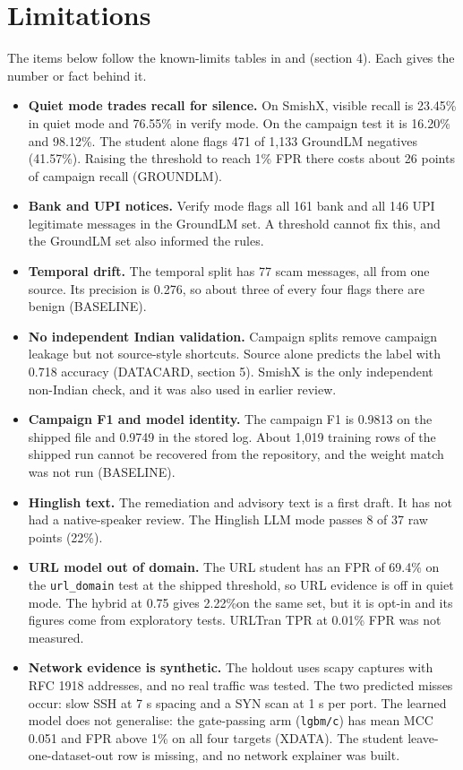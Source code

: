 \section{Limitations}\label{sec:limitations}

The items below follow the known-limits tables in  and  (section 4). Each gives the number or fact behind it.

\begin{itemize}
\item \textbf{Quiet mode trades recall for silence.} On SmishX, visible recall is 23.45\% in quiet mode and 76.55\% in verify mode. On the campaign test it is 16.20\% and 98.12\%. The student alone flags 471 of 1,133 GroundLM negatives (41.57\%). Raising the threshold to reach 1\% FPR there costs about 26 points of campaign recall (GROUNDLM).
\item \textbf{Bank and UPI notices.} Verify mode flags all 161 bank and all 146 UPI legitimate messages in the GroundLM set. A threshold cannot fix this, and the GroundLM set also informed the rules.
\item \textbf{Temporal drift.} The temporal split has 77 scam messages, all from one source. Its precision is 0.276, so about three of every four flags there are benign (BASELINE).
\item \textbf{No independent Indian validation.} Campaign splits remove campaign leakage but not source-style shortcuts. Source alone predicts the label with 0.718 accuracy (DATACARD, section 5). SmishX is the only independent non-Indian check, and it was also used in earlier review.
\item \textbf{Campaign F1 and model identity.} The campaign F1 is 0.9813 on the shipped file and 0.9749 in the stored log. About 1,019 training rows of the shipped run cannot be recovered from the repository, and the weight match was not run (BASELINE).
\item \textbf{Hinglish text.} The remediation and advisory text is a first draft. It has not had a native-speaker review. The Hinglish LLM mode passes 8 of 37 raw points (22\%)\prose.
\item \textbf{URL model out of domain.} The URL student has an FPR of 69.4\% on the \texttt{url\_domain} test at the shipped threshold, so URL evidence is off in quiet mode. The hybrid at 0.75 gives 2.22\%\prose on the same set, but it is opt-in and its figures come from exploratory tests. URLTran TPR at 0.01\% FPR was not measured.
\item \textbf{Network evidence is synthetic.} The holdout uses scapy captures with RFC 1918 addresses, and no real traffic was tested. The two predicted misses occur: slow SSH at 7 s spacing and a SYN scan at 1 s per port. The learned model does not generalise: the gate-passing arm (\texttt{lgbm/c}) has mean MCC 0.051 and FPR above 1\% on all four targets (XDATA). The student leave-one-dataset-out row is missing, and no network explainer was built.

\end{itemize}
